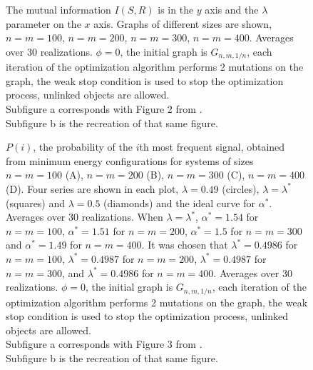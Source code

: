 \begin{figure}
  \caption{
    The mutual information $I(S,R)$ is in the $y$ axis and the $\lambda$ parameter on the $x$ axis.
    Graphs of different sizes are shown, $n=m=100$, $n=m=200$, $n=m=300$, $n=m=400$.
    Averages over 30 realizations.
    $\phi=0$, the initial graph is $G_{n,m,1/n}$, each iteration of the optimization algorithm performs 2 mutations on the graph, the weak stop condition is used to stop the optimization process, unlinked objects are allowed.\\
    Subfigure a corresponds with Figure 2 from \cite{Ferrer2005a}.\\
    Subfigure b is the recreation of that same figure.
  }
  \label{fig:fig2_2005}
\end{figure}

\begin{figure}
  \caption{
    $P(i)$, the probability of the $i$th most frequent signal, obtained from minimum energy configurations for systems of sizes $n=m=100$ (A), $n=m=200$ (B), $n=m=300$ (C), $n=m=400$ (D).
    Four series are shown in each plot, $\lambda=0.49$ (circles), $\lambda=\lambda^*$ (squares) and $\lambda=0.5$ (diamonds) and the ideal curve for $\alpha^*$.
    Averages over 30 realizations.
    When $\lambda=\lambda^*$, $\alpha^* = 1.54$ for $n=m=100$, $\alpha^* = 1.51$ for $n=m=200$, $\alpha^* = 1.5$ for $n=m=300$ and $\alpha^* = 1.49$ for $n=m=400$.
    It was chosen that $\lambda^* = 0.4986$ for $n=m=100$, $\lambda^* = 0.4987$ for $n=m=200$, $\lambda^* = 0.4987$ for $n=m=300$, and $\lambda^* = 0.4986$ for $n=m=400$.
    Averages over 30 realizations.
    $\phi=0$, the initial graph is $G_{n,m,1/n}$, each iteration of the optimization algorithm performs 2 mutations on the graph, the weak stop condition is used to stop the optimization process, unlinked objects are allowed.\\
    Subfigure a corresponds with Figure 3 from \cite{Ferrer2005a}.\\
    Subfigure b is the recreation of that same figure.
  }
  \label{fig:fig3_2005}
\end{figure}

